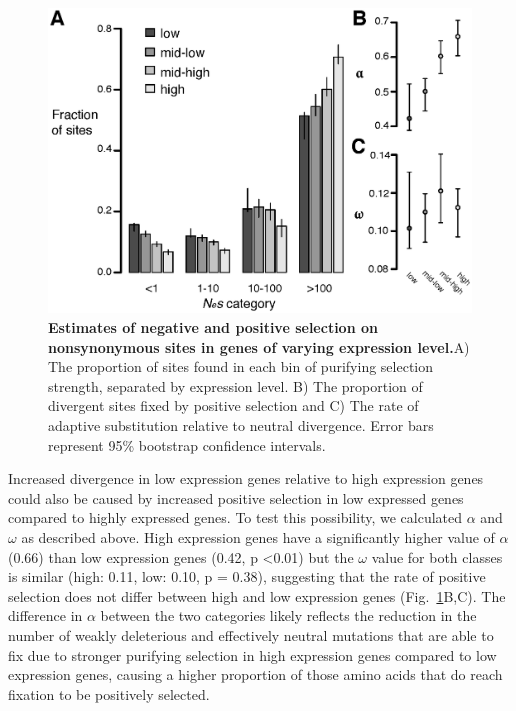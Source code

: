 \begin{figure}[ht!]
      \centering
       \includegraphics[scale=0.8]{Ch2Fig4}
    \caption{\textbf{Estimates of negative and positive selection on nonsynonymous sites in genes of varying expression level.}A) The proportion of sites found in each bin of purifying selection strength, separated by expression level.  B) The proportion of divergent sites fixed by positive selection and C) The rate of adaptive substitution relative to neutral divergence. Error bars represent 95\% bootstrap confidence intervals. }
    \label{fig:fig4}
\end{figure}

Increased divergence in low expression genes relative to high expression genes could also be caused by increased positive selection in low expressed genes compared to highly expressed genes. To test this possibility, we calculated $\alpha$ and $\omega$ as described above. High expression genes have a significantly higher value of $\alpha$ (0.66) than low expression genes (0.42, p \textless 0.01) but the $\omega$ value for both classes is similar (high: 0.11, low: 0.10, p = 0.38), suggesting that the rate of positive selection does not differ between high and low expression genes (Fig.~\ref{fig:fig4}B,C). The difference in $\alpha$ between the two categories likely reflects the reduction in the number of weakly deleterious and effectively neutral mutations that are able to fix due to stronger purifying selection in high expression genes compared to low expression genes, causing a higher proportion of those amino acids that do reach fixation to be positively selected. 


